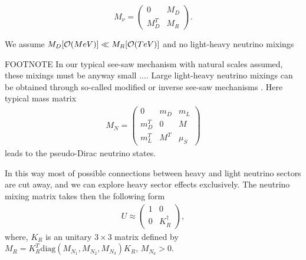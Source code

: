 \documentclass[twocolumn,superscriptaddress,showpacs,prl,nofootinbib,floatfix]{revtex4}
\begin{document}
\begin{equation}
M_{\nu}=\left(
\begin{array}{cc}
0 & M_D\\
M_D^T & M_R
\end{array}\right). \label{massm}
\end{equation}


We assume $M_D [{\cal{O}}(MeV)] \ll M_R [{\cal{O}}(TeV)]$ and  no light-heavy neutrino mixings

FOOTNOTE
In our typical see-saw mechanism with natural scales assumed, these mixings must be anyway small \cite{Gluza:2002vs,Chen:2011hc}.... Large light-heavy neutrino mixings can be obtained through so-called modified or inverse see-saw mechanisms \cite{Mohapatra:1986aw,Chen:2013foz,Deppisch:2015cua}.  Here typical mass matrix 
\begin{eqnarray}
        M_N  =  
 \left( \begin{matrix}
    0              & m_D         & m_L\\
                m^T_D        & 0           & M \\
                m^T_L      & M^T   & \mu_S
        \end{matrix} \right)
\label{eq:mtot}       
\end{eqnarray}
leads to the pseudo-Dirac neutrino states.


In this way most of possible connections between heavy and light neutrino sectors are cut away, and we can explore heavy sector effects exclusively.
The neutrino mixing matrix takes then the following form  \cite{Gluza:2015goa}  
\begin{eqnarray}\label{V}
U\approx\left(
\begin{array}{cc}
1 
& 
0\\
0 & K_{R}^\dag
\end{array}\right),
\end{eqnarray}
where, $K_{R}$ is an unitary $3\times3$ matrix defined by $M_R=K_{R}^T\mathrm{diag}(M_{N_1},M_{N_2},M_{N_3})K_{R}$, $M_{N_a}>0$.  
\end{document}
